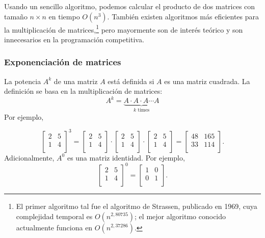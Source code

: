 Usando un sencillo algoritmo, podemos calcular el producto de dos matrices
con tamaño $n \times n$ en tiempo $O(n^3)$. También existen algoritmos más
eficientes para la multiplicación de matrices,\footnote{El primer algoritmo
    tal fue el algoritmo de Strassen, publicado en 1969\cite{str69}, cuya
    complejidad temporal es $O(n^{2,80735})$; el mejor algoritmo conocido
    actualmente \cite{gal14} funciona en $O(n^{2,37286})$.} pero
mayormente son de interés teórico y son innecesarios en la programación
competitiva.

\subsubsection{Exponenciación de matrices}


La potencia $A^k$ de una matriz $A$ está definida si $A$ es una matriz
cuadrada. La definición se basa en la multiplicación de matrices:
\[ A^k = \underbrace{A \cdot A \cdot A \cdots A}_{\textrm{$k$ times}} \]
Por ejemplo,

\[
    \begin{bmatrix}
        2 & 5 \\
        1 & 4 \\
    \end{bmatrix}^3 =
    \begin{bmatrix}
        2 & 5 \\
        1 & 4 \\
    \end{bmatrix} \cdot
    \begin{bmatrix}
        2 & 5 \\
        1 & 4 \\
    \end{bmatrix} \cdot
    \begin{bmatrix}
        2 & 5 \\
        1 & 4 \\
    \end{bmatrix} =
    \begin{bmatrix}
        48 & 165 \\
        33 & 114 \\
    \end{bmatrix}.
\]
Adicionalmente, $A^0$ es una matriz identidad. Por ejemplo,
\[
    \begin{bmatrix}
        2 & 5 \\
        1 & 4 \\
    \end{bmatrix}^0 =
    \begin{bmatrix}
        1 & 0 \\
        0 & 1 \\
    \end{bmatrix}.
\]

